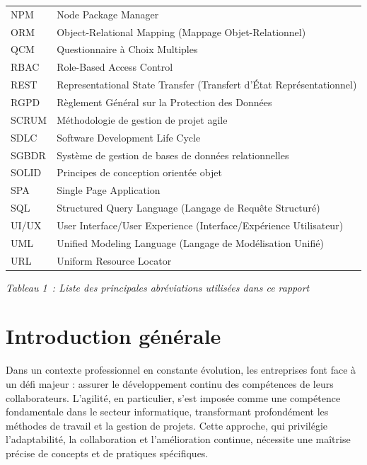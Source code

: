 \documentclass[12pt,a4paper]{report}
\begin{document}
\begin{longtable}[]{@{}
  >{\raggedright\arraybackslash}p{}
  >{\raggedright\arraybackslash}p{}@{}}
\rowcolor{lightgray}
NPM & Node Package Manager \\
ORM & Object-Relational Mapping (Mappage Objet-Relationnel) \\
\rowcolor{lightgray}
QCM & Questionnaire à Choix Multiples \\
RBAC & Role-Based Access Control \\
\rowcolor{lightgray}
REST & Representational State Transfer (Transfert d'État Représentationnel) \\
RGPD & Règlement Général sur la Protection des Données \\
\rowcolor{lightgray}
SCRUM & Méthodologie de gestion de projet agile \\
SDLC & Software Development Life Cycle \\
\rowcolor{lightgray}
SGBDR & Système de gestion de bases de données relationnelles \\
SOLID & Principes de conception orientée objet \\
\rowcolor{lightgray}
SPA & Single Page Application \\
SQL & Structured Query Language (Langage de Requête Structuré) \\
\rowcolor{lightgray}
UI/UX & User Interface/User Experience (Interface/Expérience Utilisateur) \\
UML & Unified Modeling Language (Langage de Modélisation Unifié) \\
\rowcolor{lightgray}
URL & Uniform Resource Locator \\
\bottomrule
\end{longtable}

\begin{center}
\textit{Tableau 1~: Liste des principales abréviations utilisées dans ce rapport}
\end{center}
\cleardoublepage

\tableofcontents
\cleardoublepage
{}
\listoffigures
\cleardoublepage

\setcounter{page}{1}
\chapter*{Introduction générale}

\noindent
Dans un contexte professionnel en constante évolution, les entreprises
font face à un défi majeur : assurer le développement continu des
compétences de leurs collaborateurs. L'agilité, en
particulier, s'est imposée comme une compétence
fondamentale dans le secteur informatique, transformant profondément les
méthodes de travail et la gestion de projets. Cette approche, qui
privilégie l'adaptabilité, la collaboration et
l'amélioration continue, nécessite une maîtrise précise
de concepts et de pratiques spécifiques.
\end{document}
